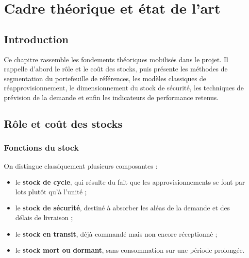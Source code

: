 \chapter{Cadre théorique et état de l'art}
\label{chap:etat_art}

\section*{Introduction}

Ce chapitre rassemble les fondements théoriques mobilisés dans le projet. Il
rappelle d'abord le rôle et le coût des stocks, puis présente les méthodes de
segmentation du portefeuille de références, les modèles classiques de
réapprovisionnement, le dimensionnement du stock de sécurité, les techniques de
prévision de la demande et enfin les indicateurs de performance retenus.

\section{Rôle et coût des stocks}
\label{sec:role_stocks}

\subsection{Fonctions du stock}


On distingue classiquement plusieurs composantes :

\begin{itemize}
  \item le \textbf{stock de cycle}, qui résulte du fait que les
    approvisionnements se font par lots plutôt qu'à l'unité ;
  \item le \textbf{stock de sécurité}, destiné à absorber les aléas de la
    demande et des délais de livraison ;
  \item le \textbf{stock en transit}, déjà commandé mais non encore réceptionné ;
  \item le \textbf{stock mort ou dormant}, sans consommation sur une période
    prolongée.
\end{itemize}

